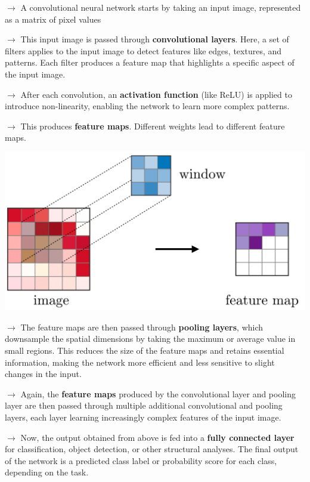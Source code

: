 \documentclass[letterpaper, 10.5pt,landscape]{article}
\begin{document}
\begin{multicols*}{3}
\vspace{-7pt}

$\rightarrow$ A convolutional neural network starts by taking an input image, represented as a matrix of pixel values 

$\rightarrow$ This input image is passed through \textbf{convolutional layers}. Here, a set of filters applies to the input image to detect features like edges, textures, and patterns. Each filter produces a feature map that highlights a specific aspect of the input image. 

$\rightarrow$ After each convolution, an \textbf{activation function} (like ReLU) is applied to introduce non-linearity, enabling the network to learn more complex patterns.

$\rightarrow$ This produces \textbf{feature maps}. Different weights lead to different feature maps.
\vspace{-7pt}
\begin{center}
    \includegraphics[scale = .09]{figures/windowCNNNew.JPG}
\end{center}
\vspace{-7pt}

$\rightarrow$ The feature maps are then passed through \textbf{pooling layers}, which downsample the spatial dimensions by taking the maximum or average value in small regions. This reduces the size of the feature maps and retains essential information, making the network more efficient and less sensitive to slight changes in the input.

$\rightarrow$ Again, the \textbf{feature maps} produced by the convolutional layer and pooling layer are then passed through multiple additional convolutional and pooling layers, each layer learning increasingly complex features of the input image. 


$\rightarrow$ Now, the output obtained from above is fed into a \textbf{fully connected layer} for classification, object detection, or other structural analyses. The final output of the network is a predicted class label or probability score for each class, depending on the task.



\end{multicols*}
\end{document}
